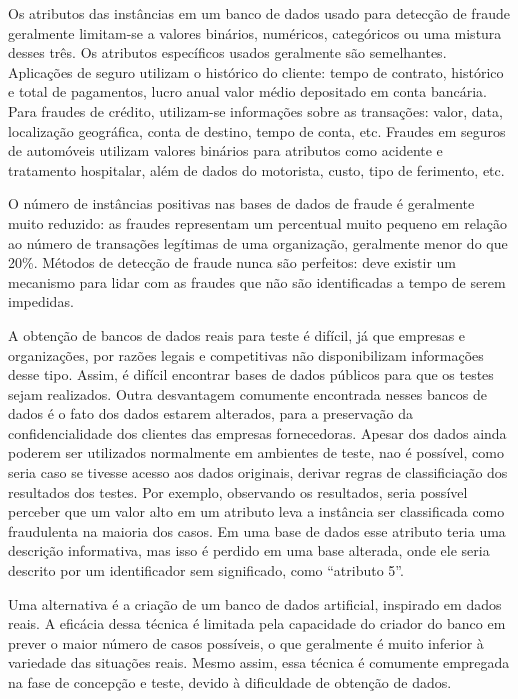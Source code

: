 Os atributos das instâncias em um banco de dados usado para detecção de fraude geralmente limitam-se a valores binários, numéricos, categóricos ou uma mistura desses três. Os atributos específicos usados geralmente são semelhantes. Aplicações de seguro utilizam o histórico do cliente: tempo de contrato, histórico e total de pagamentos, lucro anual valor médio depositado em conta bancária. Para fraudes de crédito, utilizam-se informações sobre as transações: valor, data, localização geográfica, conta de destino, tempo de conta, etc. Fraudes em seguros de automóveis utilizam valores binários para atributos como acidente e tratamento hospitalar, além de dados do motorista, custo, tipo de ferimento, etc.

O número de instâncias positivas nas bases de dados de fraude é geralmente muito reduzido: as fraudes representam um percentual muito pequeno em relação ao número de transações legítimas de uma organização, geralmente menor do que 20\%. Métodos de detecção de fraude nunca são perfeitos: deve existir um mecanismo para lidar com as fraudes que não são identificadas a tempo de serem impedidas.

A obtenção de bancos de dados reais para teste é difícil, já que empresas e organizações, por razões legais e competitivas não disponibilizam informações desse tipo. Assim, é difícil encontrar bases de dados públicos para que os testes sejam realizados. Outra desvantagem comumente encontrada nesses bancos de dados é o fato dos dados estarem alterados, para a preservação da confidencialidade dos clientes das empresas fornecedoras. Apesar dos dados ainda poderem ser utilizados normalmente em ambientes de teste, nao é possível, como seria caso se tivesse acesso aos dados originais, derivar regras de classificiação dos resultados dos testes. Por exemplo, observando os resultados, seria possível perceber que um valor alto em um atributo leva a instância ser classificada como fraudulenta na maioria dos casos. Em uma base de dados esse atributo teria uma descrição informativa, mas isso é perdido em uma base alterada, onde ele seria descrito por um identificador sem significado, como ``atributo 5''.

Uma alternativa é a criação de um banco de dados artificial, inspirado em dados reais. A eficácia dessa técnica é limitada pela capacidade do criador do banco em prever o maior número de casos possíveis, o que geralmente é muito inferior à variedade das situações reais. Mesmo assim, essa técnica é comumente empregada na fase de concepção e teste, devido à dificuldade de obtenção de dados.

